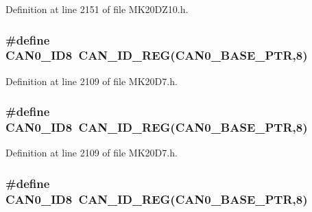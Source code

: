 Definition at line 2151 of file M\+K20\+D\+Z10.\+h.

\subsubsection[{\texorpdfstring{C\+A\+N0\+\_\+\+I\+D8}{CAN0_ID8}}]{\setlength{\rightskip}{0pt plus 5cm}\#define C\+A\+N0\+\_\+\+I\+D8~{\bf C\+A\+N\+\_\+\+I\+D\+\_\+\+R\+EG}({\bf C\+A\+N0\+\_\+\+B\+A\+S\+E\+\_\+\+P\+TR},8)}\hypertarget{group___c_a_n___register___accessor___macros_gaa3adbf537208d31fdcc456deded9ccd7}{}\label{group___c_a_n___register___accessor___macros_gaa3adbf537208d31fdcc456deded9ccd7}


Definition at line 2109 of file M\+K20\+D7.\+h.

\subsubsection[{\texorpdfstring{C\+A\+N0\+\_\+\+I\+D8}{CAN0_ID8}}]{\setlength{\rightskip}{0pt plus 5cm}\#define C\+A\+N0\+\_\+\+I\+D8~{\bf C\+A\+N\+\_\+\+I\+D\+\_\+\+R\+EG}({\bf C\+A\+N0\+\_\+\+B\+A\+S\+E\+\_\+\+P\+TR},8)}\hypertarget{group___c_a_n___register___accessor___macros_gaa3adbf537208d31fdcc456deded9ccd7}{}\label{group___c_a_n___register___accessor___macros_gaa3adbf537208d31fdcc456deded9ccd7}


Definition at line 2109 of file M\+K20\+D7.\+h.

\subsubsection[{\texorpdfstring{C\+A\+N0\+\_\+\+I\+D8}{CAN0_ID8}}]{\setlength{\rightskip}{0pt plus 5cm}\#define C\+A\+N0\+\_\+\+I\+D8~{\bf C\+A\+N\+\_\+\+I\+D\+\_\+\+R\+EG}({\bf C\+A\+N0\+\_\+\+B\+A\+S\+E\+\_\+\+P\+TR},8)}\hypertarget{group___c_a_n___register___accessor___macros_gaa3adbf537208d31fdcc456deded9ccd7}{}\label{group___c_a_n___register___accessor___macros_gaa3adbf537208d31fdcc456deded9ccd7}


